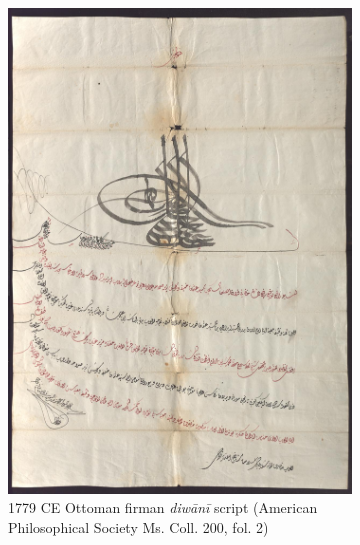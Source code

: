 \begin{figure}[h!tp]
\begin{subfigure}[t]{.48\textwidth}
		\includegraphics[height=0.4\textheight]{images/9676_0002_web.jpg}
		\caption{1779 CE Ottoman firman \emph{diwānī} script (American Philosophical Society Ms. Coll. 200, fol. 2)}
                \label{fig:ara_diwani}
        \end{subfigure}
	\hfill
	\begin{subfigure}[t]{.48\textwidth}
		\centering

\end{subfigure}
\end{figure}
